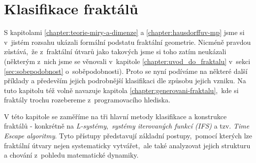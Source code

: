 \chapter{Klasifikace fraktálů}\label{chapter:klasifikace-fraktalu}

S kapitolami \ref{chapter:teorie-miry-a-dimenze} a \ref{chapter:hausdorffuv-mp} jsme si v~jistém rozsahu ukázali formální podstatu fraktální geometrie. Nicméně pravdou zůstává,~že z~fraktální útvarů jako takových jsme si toho zatím neukázali (některým z~nich jsme se věnovali v~kapitole \ref{chapter:uvod_do_fraktalu} v~sekci \ref{sec:sobepodobnost} o~soběpodobnosti). Proto se nyní podíváme na některé další příklady a především jejich podrobnější klasifikaci dle způsobu jejich vzniku. Na tuto kapitolu též volně navazuje kapitola \ref{chapter:generovani-fraktalu},~kde si fraktály trochu rozebereme z~programovacího hlediska.

V této kapitole se zaměříme na tři hlavní metody klasifikace a konstrukce fraktálů - konkrétně na \emph{L-systémy},~\emph{systémy iterovaných funkcí (IFS)} a tzv. \emph{Time Escape algoritmy}. Tyto přístupy představují základní postupy,~pomocí kterých lze fraktální útvary nejen systematicky vytvářet,~ale také analyzovat jejich strukturu a chování z~pohledu matematické dynamiky.



